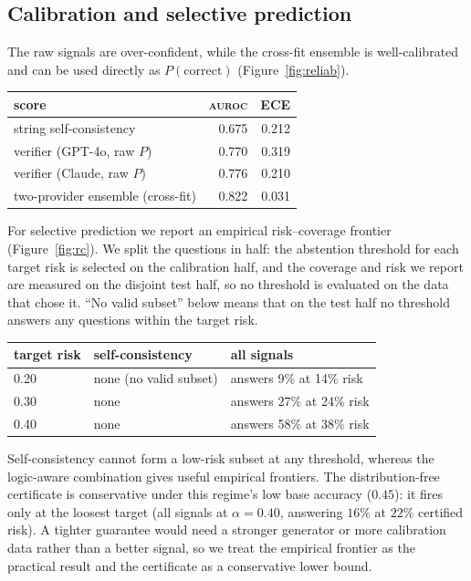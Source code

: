 \documentclass[11pt]{article}
\newcommand{\auroc}{\textsc{auroc}}
\begin{document}
\subsection{Calibration and selective prediction}
\label{sec:cal}
The raw signals are over-confident, while the cross-fit ensemble is well-calibrated and can be used
directly as $P(\text{correct})$ (Figure~\ref{fig:reliab}).
\begin{table}[h]\centering
\begin{tabular}{lrr}
\toprule
score & \auroc{} & ECE \\
\midrule
string self-consistency & 0.675 & 0.212 \\
verifier (GPT-4o, raw $P$) & 0.770 & 0.319 \\
verifier (Claude, raw $P$) & 0.776 & 0.210 \\
two-provider ensemble (cross-fit) & 0.822 & 0.031 \\
\bottomrule
\end{tabular}
\end{table}

For selective prediction we report an empirical risk--coverage frontier (Figure~\ref{fig:rc}). We
split the questions in half: the abstention threshold for each target risk is selected on the
calibration half, and the coverage and risk we report are measured on the disjoint test half, so no
threshold is evaluated on the data that chose it. ``No valid subset'' below means that on the test
half no threshold answers any questions within the target risk.
\begin{table}[h]\centering
\begin{tabular}{lll}
\toprule
target risk & self-consistency & all signals \\
\midrule
0.20 & none (no valid subset) & answers 9\% at 14\% risk \\
0.30 & none & answers 27\% at 24\% risk \\
0.40 & none & answers 58\% at 38\% risk \\
\bottomrule
\end{tabular}
\end{table}
Self-consistency cannot form a low-risk subset at any threshold, whereas the logic-aware combination
gives useful empirical frontiers. The distribution-free certificate is conservative under this
regime's low base accuracy ($0.45$): it fires only at the loosest target (all signals at
$\alpha=0.40$, answering $16\%$ at $22\%$ certified risk). A tighter guarantee would need a stronger
generator or more calibration data rather than a better signal, so we treat the empirical frontier as
the practical result and the certificate as a conservative lower bound.
\end{document}
